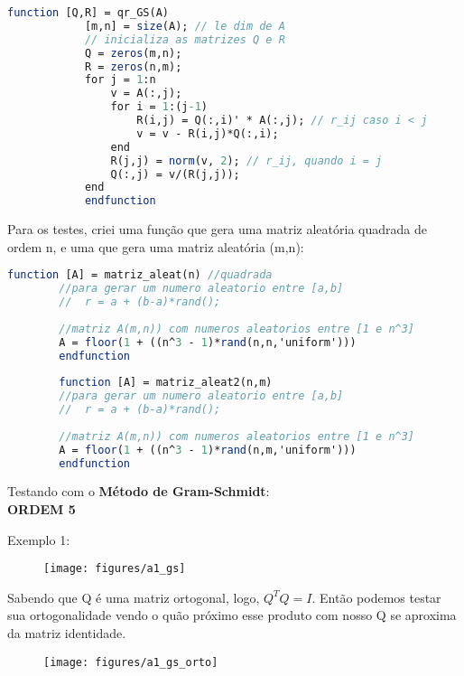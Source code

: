 \documentclass[leqno]{article}
\numberwithin{equation}{section}
\begin{document}
		\begin{sol}
		\begin{lstlisting}[style=mystyle, language=Scilab]
			function [Q,R] = qr_GS(A)
			[m,n] = size(A); // le dim de A
			// inicializa as matrizes Q e R
			Q = zeros(m,n);
			R = zeros(n,m);
			for j = 1:n 
				v = A(:,j);
				for i = 1:(j-1)
					R(i,j) = Q(:,i)' * A(:,j); // r_ij caso i < j
					v = v - R(i,j)*Q(:,i);
				end
				R(j,j) = norm(v, 2); // r_ij, quando i = j
				Q(:,j) = v/(R(j,j));
			end
			endfunction
		\end{lstlisting}	
	
	\vspace{0.3cm}	
	\end{sol}

	Para os testes, criei uma função que gera uma matriz aleatória quadrada de ordem n, e uma que gera uma matriz aleatória (m,n):
	\begin{lstlisting}[style=mystyle, language=Scilab]
		function [A] = matriz_aleat(n) //quadrada
		//para gerar um numero aleatorio entre [a,b]
		//  r = a + (b-a)*rand();
		
		//matriz A(m,n)) com numeros aleatorios entre [1 e n^3]
		A = floor(1 + ((n^3 - 1)*rand(n,n,'uniform')))
		endfunction
		
		function [A] = matriz_aleat2(n,m) 
		//para gerar um numero aleatorio entre [a,b]
		//  r = a + (b-a)*rand();
		
		//matriz A(m,n)) com numeros aleatorios entre [1 e n^3]
		A = floor(1 + ((n^3 - 1)*rand(n,m,'uniform')))
		endfunction		
	\end{lstlisting}

	\noindent Testando com o \textbf{Método de Gram-Schmidt}:\\

	\noindent \textbf{{\large ORDEM 5}}
	
	Exemplo 1:
	
	\begin{figure}[H]
		\centering
		\texttt{[image: figures/a1\_gs]}		
	\end{figure}

	Sabendo que Q é uma matriz ortogonal, logo, $Q^TQ = I$. Então podemos testar sua ortogonalidade vendo o quão próximo esse produto com nosso Q se aproxima da matriz identidade.
	
	\begin{figure}[H]
		\centering
		\texttt{[image: figures/a1\_gs\_orto]}		
	\end{figure}
\end{document}
